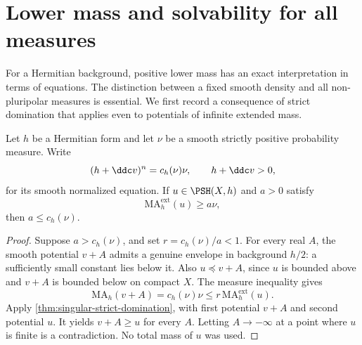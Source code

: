 \section{Lower mass and solvability for all measures}
\label{sec:lower-mass-solvability}

For a Hermitian background, positive lower mass has an exact interpretation in terms of equations. The distinction between a fixed smooth density and all non-pluripolar measures is essential. We first record a consequence of strict domination that applies even to potentials of infinite extended mass.

\begin{lemma}\label{lem:smooth-normalizer-subsolution-bound}
Let $h$ be a Hermitian form and let $\nu$ be a smooth strictly positive probability measure. Write
\[
 (h+\ddc v)^n=c_h(\nu)\nu,\qquad h+\ddc v>0,
\]
for its smooth normalized equation. If $u\in\PSH(X,h)$ and $a>0$ satisfy
\[
 \mathrm{MA}^{\mathrm{ext}}_h(u)\geq a\nu,
\]
then $a\leq c_h(\nu)$.
\end{lemma}
\begin{proof}
Suppose $a>c_h(\nu)$, and set $r=c_h(\nu)/a<1$. For every real $A$, the smooth potential $v+A$ admits a genuine envelope in background $h/2$: a sufficiently small constant lies below it. Also $u\preceq v+A$, since $u$ is bounded above and $v+A$ is bounded below on compact $X$. The measure inequality gives
\[
 \mathrm{MA}_h(v+A)=c_h(\nu)\nu
       \leq r\,\mathrm{MA}^{\mathrm{ext}}_h(u).
\]
Apply \cref{thm:singular-strict-domination}, with first potential $v+A$ and second potential $u$. It yields $v+A\geq u$ for every $A$. Letting $A\to-\infty$ at a point where $u$ is finite is a contradiction. No total mass of $u$ was used.
\end{proof}


